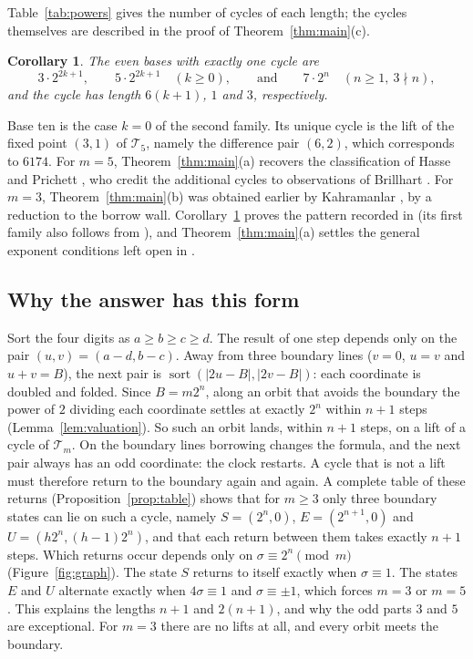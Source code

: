 \documentclass[11pt]{amsart}
\newtheorem{corollary}[theorem]{Corollary}
\theoremstyle{definition}
\theoremstyle{remark}
\DeclareMathOperator{\sort}{sort}
\newcommand{\T}{\mathcal{T}}
\begin{document}
Table~\ref{tab:powers} gives the number of cycles of each length; the cycles themselves are described in the proof of Theorem~\ref{thm:main}(c).

\begin{corollary}\label{cor:unique}
The even bases with exactly one cycle are
\[
3\cdot2^{2k+1},\qquad 5\cdot2^{2k+1}\quad(k\ge0),\qquad\text{and}\qquad 7\cdot2^n\quad(n\ge1,\ 3\nmid n),
\]
and the cycle has length $6(k+1)$, $1$ and $3$, respectively.
\end{corollary}

Base ten is the case $k=0$ of the second family. Its unique cycle is the lift of the fixed point $(3,1)$ of $\T_5$, namely the difference pair $(6,2)$, which corresponds to $6174$. For $m=5$, Theorem~\ref{thm:main}(a) recovers the classification of Hasse and Prichett \cite[Theorem~4.1]{HP}, who credit the additional cycles to observations of Brillhart \cite[p.~123]{HP}. For $m=3$, Theorem~\ref{thm:main}(b) was obtained earlier by Kahramanlar \cite[Section~5]{Kah}, by a reduction to the borrow wall. Corollary~\ref{cor:unique} proves the pattern recorded in \cite[Remark~28]{COST} (its first family also follows from \cite{Kah}), and Theorem~\ref{thm:main}(a) settles the general exponent conditions left open in \cite[Section~9]{KSL}.

\subsection*{Why the answer has this form}
Sort the four digits as $a\ge b\ge c\ge d$. The result of one step depends only on the pair $(u,v)=(a-d,b-c)$. Away from three boundary lines ($v=0$, $u=v$ and $u+v=B$), the next pair is $\sort(|2u-B|,|2v-B|)$: each coordinate is doubled and folded. Since $B=m2^n$, along an orbit that avoids the boundary the power of $2$ dividing each coordinate settles at exactly $2^n$ within $n+1$ steps (Lemma~\ref{lem:valuation}). So such an orbit lands, within $n+1$ steps, on a lift of a cycle of $\T_m$. On the boundary lines borrowing changes the formula, and the next pair always has an odd coordinate: the clock restarts. A cycle that is not a lift must therefore return to the boundary again and again. A complete table of these returns (Proposition~\ref{prop:table}) shows that for $m\ge3$ only three boundary states can lie on such a cycle, namely $S=(2^n,0)$, $E=(2^{n+1},0)$ and $U=(h2^n,(h-1)2^n)$, and that each return between them takes exactly $n+1$ steps. Which returns occur depends only on $\sigma\equiv2^n\pmod m$ (Figure~\ref{fig:graph}). The state $S$ returns to itself exactly when $\sigma\equiv1$. The states $E$ and $U$ alternate exactly when $4\sigma\equiv1$ and $\sigma\equiv\pm1$, which forces $m=3$ or $m=5$. This explains the lengths $n+1$ and $2(n+1)$, and why the odd parts $3$ and $5$ are exceptional. For $m=3$ there are no lifts at all, and every orbit meets the boundary.
\end{document}
